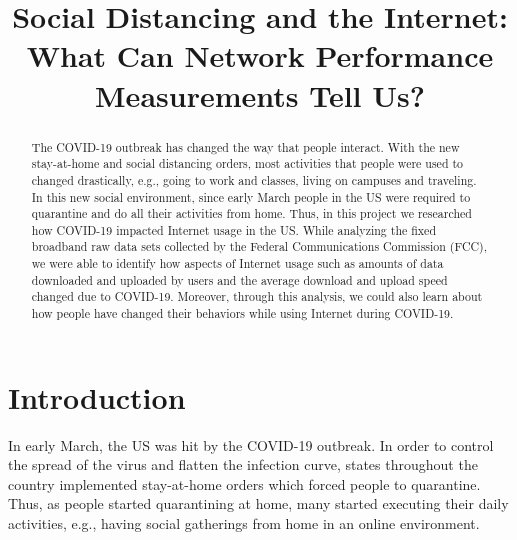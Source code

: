 \documentclass[conference,10pt]{IEEEtran}
\begin{document}
\title{Social Distancing and the Internet: What Can Network Performance Measurements Tell Us?}

\author{
    \and
}

\maketitle

\begin{abstract}
The COVID-19 outbreak has changed the way that people interact. With the new stay-at-home and social distancing orders, most activities that people were used to changed drastically, e.g., going to work and classes, living on campuses and traveling. In this new social environment, since early March people in the US were required to quarantine and do all their activities from home. Thus, in this project we researched how COVID-19 impacted Internet usage in the US. While analyzing the fixed broadband raw data sets collected by the Federal Communications Commission (FCC), we were able to identify how aspects of Internet usage such as amounts of data downloaded and uploaded by users and the average download and upload speed changed due to COVID-19. Moreover, through this analysis, we could also learn about how people have changed their behaviors while using Internet during COVID-19.
\end{abstract}

\section{Introduction}
\label{sec:introduction}

In early March, the US was hit by the COVID-19 outbreak. In order to control the spread of the virus and flatten the infection curve, states throughout the country implemented stay-at-home orders which forced people to quarantine. Thus, as people started quarantining at home, many started executing their daily activities, e.g., having social gatherings from home in an online environment.
\end{document}
